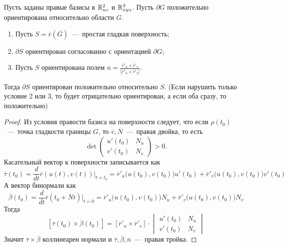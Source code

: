 \begin{lemma}
Пусть заданы правые базисы в $\mathbb{R}^2_{uv}$ и $\mathbb{R}^3_{xyz}$. Пусть $\partial G$ положительно ориентирована относительно области $G$.\begin{enumerate}
    \item Пусть $S = \overline{r}(\overline{G})$~---~простая гладкая поверхность;
    \item $\partial S$ ориентирован согласованно с ориентацией $\partial G$;
    \item Пусть $S$ ориентирована полем $\overline{n} = \frac{\overline{r}'_u \times \overline{r}'_v}{|\overline{r}'_u \times \overline{r}'_v|}$.
\end{enumerate}  
    Тогда $\partial S$ ориентирован положительно относительно $S$. (Если нарушить только условие 2 или 3, то будет отрицательно ориентирован, а если оба сразу, то положительно)
\end{lemma}
\begin{proof}
    Из условия правости базиса на поверхности следует, что если $\rho(t_0)$~---~точка гладкости границы $G$, то $\overline{v}, \overline{N}$~---~правая двойка, то есть \[
        \det \begin{pmatrix}
            u'(t_0) & N_u \\ v'(t_0) & N_v
        \end{pmatrix} > 0.
    \]
    Касательный вектор к поверхности записывается как \[\overline{\tau}(t_0) = \dfrac{d}{dt} \overline{r}(u(t), v(t))|_{t = t_0} = \overline{r}'_u \Big(u(t_0), v(t_0)\Big)u'(t_0) + \overline{r}'_v \Big(u(t_0), v(t_0) \Big)v'(t_0)\]
    А вектор бинормали как \[\overline{\beta}(t_0) = \dfrac{d}{dt} \overline{r}(t_0 + \overline{N}t)|_{t = 0} = \overline{r}'_u \Big(u(t_0), v(t_0)\Big)N_u + \overline{r}'_v \Big(u(t_0), v(t_0)\Big)N_v\]
    Тогда \[ [\overline{\tau}(t_0) \times \overline{\beta}(t_0)] = [\overline{r}'_u \times \overline{r}'_v] \cdot \begin{vmatrix}
        u'(t_0) & N_u \\ v'(t_0) & N_v
    \end{vmatrix}\]
    Значит $\overline{\tau} \times \overline{\beta}$ коллинеарен нормали и $\overline{\tau}, \overline{\beta}, \overline{n}$~---~правая тройка.
\end{proof}

